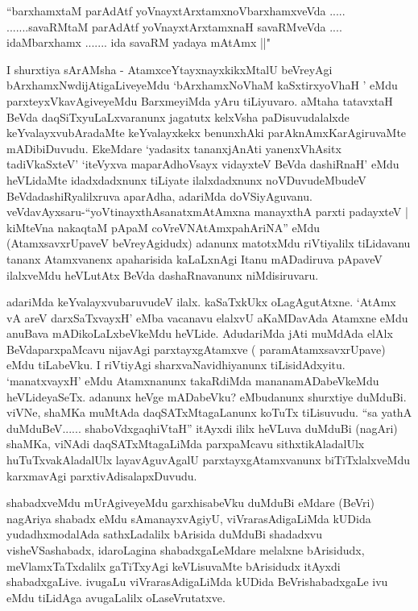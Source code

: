 \begin{shl}
``barxhamxtaM parAdAtf yoV\s nayxtArxtamxnoVbarxhamxveVda .....
.......savaRMtaM parAdAtf yoV\s nayxtArxtamxnaH savaRMveVda ....
idaMbarxhamx ....... ida savaRM yadaya mAtAmx ||"
\end{shl}

\begin{artha}
I shurxtiya sArAMsha - AtamxceYtayxnayxkikxMtalU beVreyAgi
bArxhamxNwdijAtigaLiveyeMdu `bArxhamxNoV\s haM kaSxtirxyoV\s haH	' eMdu parxteyxVkavAgiveyeMdu
 BarxmeyiMda yAru tiLiyuvaro. aMtaha tatavxtaH BeVda
daqSiTxyuLaLxvaranunx jagatutx kelxVsha paDisuvudalalxde
keYvalayxvubAradaMte keYvalayxkekx benunxhAki parAknAmxKarAgiruvaMte
mADibiDuvudu. EkeMdare `yadasitx tananxjAnAti yanenxVhAsitx tadiVkaSxteV' `iteVyxva maparAdhoV\s sayx vidayxteV BeVda dashiRnaH' eMdu heVLidaMte idadxdadxnunx
tiLiyate ilalxdadxnunx noVDuvudeMbudeV BeVdadashiRyalilxruva aparAdha,
adariMda doVSiyAguvanu. veVdavAyxsaru-``yoVtinayxthAsanatxmAtAmxna manayxthA parxti padayxteV | kiMteVna nakaqtaM pApaM coVreVNAtAmxpahAriNA'' eMdu (AtamxsavxrUpaveV
beVreyAgidudx) adanunx matotxMdu riVtiyalilx tiLidavanu tananx
Atamxvanenx apaharisida kaLaLxnAgi Itanu mADadiruva pApaveV ilalxveMdu
heVLutAtx BeVda dashaRnavanunx niMdisiruvaru.

adariMda keYvalayxvubaruvudeV ilalx. kaSaTxkUkx
oLagAgutAtxne. `AtAmx vA areV darxSaTxvayxH' eMba vacanavu elalxvU aKaMDavAda Atamxne eMdu
anuBava mADikoLaLxbeVkeMdu heVLide. AdudariMda jAti muMdAda elAlx
BeVdaparxpaMcavu nijavAgi parxtayxgAtamxve ( paramAtamxsavxrUpave)
eMdu tiLabeVku. I riVtiyAgi sharxvaNavidhiyanunx
tiLisidAdxyitu. `manatxvayxH' eMdu Atamxnanunx takaRdiMda
mananamADabeVkeMdu heVLideyaSeTx. adanunx heVge mADabeVku? eMbudanunx
shurxtiye duMduBi. viVNe, shaMKa muMtAda daqSATxMtagaLanunx koTuTx
tiLisuvudu. ``sa yathA duMduBeV...... shaboVdxgaqhiVtaH'' itAyxdi ililx heVLuva duMduBi (nagAri) shaMKa, viNAdi
daqSATxMtagaLiMda parxpaMcavu sithxtikAladalUlx huTuTxvakAladalUlx
layavAguvAgalU parxtayxgAtamxvanunx biTiTxlalxveMdu karxmavAgi
parxtivAdisalapxDuvudu. 

shabadxveMdu mUrAgiveyeMdu garxhisabeVku duMduBi eMdare (BeVri)
 nagAriya shabadx eMdu sAmanayxvAgiyU, viVrarasAdigaLiMda kUDida
yudadhxmodalAda sathxLadalilx bArisida duMduBi shadadxvu
visheVSashabadx, idaroLagina shabadxgaLeMdare melalxne bArisidudx,
meVlamxTaTxdalilx gaTiTxyAgi keVLisuvaMte bArisidudx itAyxdi
shabadxgaLive. ivugaLu viVrarasAdigaLiMda kUDida BeVrishabadxgaLe ivu
eMdu tiLidAga avugaLalilx oLaseVrutatxve.


\end{artha}
